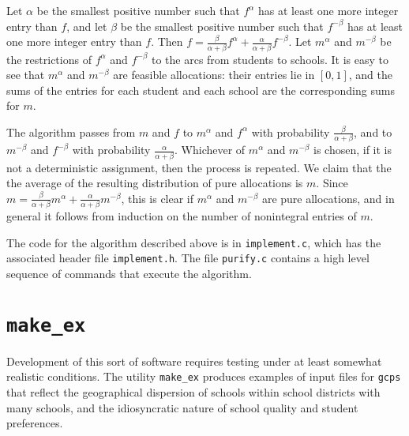 \documentclass[12pt]{article}
\theoremstyle{definition}
\begin{document}
Let $\alpha$ be the smallest positive number such that $f^\alpha$ has
at least one more integer entry than $f$, and let $\beta$ be the
smallest positive number such that $f^{-\beta}$ has at least one more
integer entry than $f$.  Then $f = \tfrac{\beta}{\alpha +
  \beta}f^\alpha + \tfrac{\alpha}{\alpha + \beta}f^{-\beta}$.  Let
$m^\alpha$ and $m^{-\beta}$ be the restrictions of $f^\alpha$ and
$f^{-\beta}$ to the arcs from students to schools.  It is easy to see
that $m^\alpha$ and $m^{-\beta}$ are feasible allocations: their
entries lie in $[0,1]$, and the sums of the entries for each student
and each school are the corresponding sums for $m$.

The algorithm passes from $m$ and $f$ to $m^\alpha$ and $f^{\alpha}$
with probability $\tfrac{\beta}{\alpha + \beta}$, and to $m^{-\beta}$
and $f^{-\beta}$ with probability $\tfrac{\alpha}{\alpha + \beta}$.
Whichever of $m^\alpha$ and $m^{-\beta}$ is chosen, if it is not a
deterministic assignment, then the process is repeated.  We claim that
the the average of the resulting distribution of pure allocations is
$m$.  Since $m = \tfrac{\beta}{\alpha + \beta}m^\alpha +
\tfrac{\alpha}{\alpha + \beta}m^{-\beta}$, this is clear if $m^\alpha$
and $m^{-\beta}$ are pure allocations, and in general it follows from
induction on the number of nonintegral entries of $m$.

The code for the algorithm described above is in \texttt{implement.c},
which has the associated header file \texttt{implement.h}.  The file
\texttt{purify.c} contains a high level sequence of commands that
execute the algorithm.

\section{\texttt{make\_ex}}

Development of this sort of software requires testing under at least
somewhat realistic conditions.  The utility \texttt{make\_ex} produces
examples of input files for \texttt{gcps} that reflect the
geographical dispersion of schools within school districts with many
schools, and the idiosyncratic nature of school quality and student
preferences.
\end{document}
